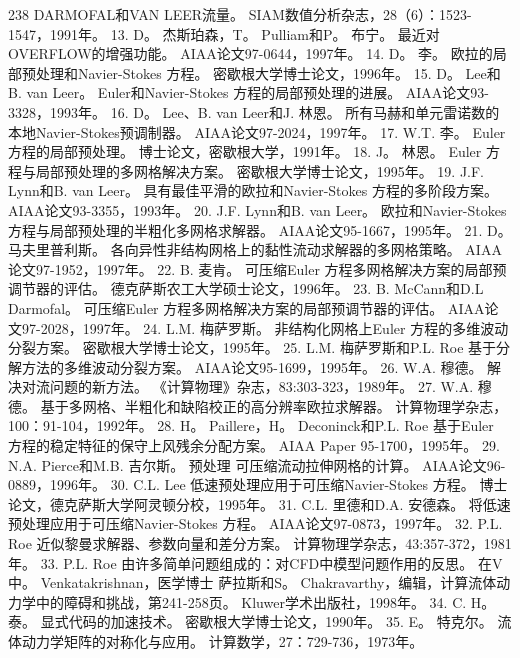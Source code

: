 \documentclass[UTF8,11pt,a4paper,openany,fontset=fandol]{ctexbook}
\begin{document}
238 DARMOFAL和VAN LEER流量。 SIAM数值分析杂志，28（6）：1523-1547，1991年。 13. D。 杰斯珀森，T。 Pulliam和P。 布宁。 最近对OVERFLOW的增强功能。 AIAA论文97-0644，1997年。 14. D。 李。 欧拉的局部预处理和Navier-Stokes 方程。 密歇根大学博士论文，1996年。 15. D。 Lee和B. van Leer。 Euler和Navier-Stokes 方程的局部预处理的进展。 AIAA论文93-3328，1993年。 16. D。 Lee、B. van Leer和J. 林恩。 所有马赫和单元雷诺数的本地Navier-Stokes预调制器。 AIAA论文97-2024，1997年。 17. W.T. 李。 Euler 方程的局部预处理。 博士论文，密歇根大学，1991年。 18. J。 林恩。 Euler 方程与局部预处理的多网格解决方案。 密歇根大学博士论文，1995年。 19. J.F. Lynn和B. van Leer。 具有最佳平滑的欧拉和Navier-Stokes 方程的多阶段方案。 AIAA论文93-3355，1993年。 20. J.F. Lynn和B. van Leer。 欧拉和Navier-Stokes 方程与局部预处理的半粗化多网格求解器。 AIAA论文95-1667，1995年。 21. D。 马夫里普利斯。 各向异性非结构网格上的黏性流动求解器的多网格策略。 AIAA论文97-1952，1997年。 22. B. 麦肯。 可压缩Euler 方程多网格解决方案的局部预调节器的评估。 德克萨斯农工大学硕士论文，1996年。 23. B. McCann和D.L Darmofal。 可压缩Euler 方程多网格解决方案的局部预调节器的评估。 AIAA论文97-2028，1997年。 24. L.M. 梅萨罗斯。 非结构化网格上Euler 方程的多维波动分裂方案。 密歇根大学博士论文，1995年。 25. L.M. 梅萨罗斯和P.L. Roe 基于分解方法的多维波动分裂方案。 AIAA论文95-1699，1995年。 26. W.A. 穆德。 解决对流问题的新方法。 《计算物理》杂志，83:303-323，1989年。 27. W.A. 穆德。 基于多网格、半粗化和缺陷校正的高分辨率欧拉求解器。 计算物理学杂志，100：91-104，1992年。 28. H。 Paillere，H。 Deconinck和P.L. Roe 基于Euler 方程的稳定特征的保守上风残余分配方案。 AIAA Paper 95-1700，1995年。 29. N.A. Pierce和M.B. 吉尔斯。 预处理 可压缩流动拉伸网格的计算。 AIAA论文96-0889，1996年。 30. C.L. Lee 低速预处理应用于可压缩Navier-Stokes 方程。 博士论文，德克萨斯大学阿灵顿分校，1995年。 31. C.L. 里德和D.A. 安德森。 将低速预处理应用于可压缩Navier-Stokes 方程。 AIAA论文97-0873，1997年。 32. P.L. Roe 近似黎曼求解器、参数向量和差分方案。 计算物理学杂志，43:357-372，1981年。 33. P.L. Roe 由许多简单问题组成的：对CFD中模型问题作用的反思。 在V中。 Venkatakrishnan，医学博士 萨拉斯和S。 Chakravarthy，编辑，计算流体动力学中的障碍和挑战，第241-258页。 Kluwer学术出版社，1998年。 34. C. H。 泰。 显式代码的加速技术。 密歇根大学博士论文，1990年。 35. E。 特克尔。 流体动力学矩阵的对称化与应用。 计算数学，27：729-736，1973年。
\end{document}
